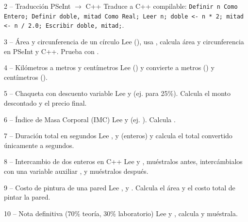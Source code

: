 \documentclass[11pt,letterpaper]{article}
\begin{document}
\begin{ejercicio}{2 -- Traducción PSeInt $\rightarrow$ C++}
Traduce a C++ compilable: \texttt{Definir n Como Entero; Definir doble, mitad Como Real; Leer n; doble <- n * 2; mitad <- n / 2.0; Escribir doble, mitad;}.
\end{ejercicio}

\begin{ejercicio}{3 -- Área y circunferencia de un círculo}
Lee  (), usa , calcula área y circunferencia en PSeInt y C++. Prueba con .
\end{ejercicio}

\begin{ejercicio}{4 -- Kilómetros a metros y centímetros}
Lee  () y convierte a metros () y centímetros ().
\end{ejercicio}

\begin{ejercicio}{5 -- Chaqueta con descuento variable}
Lee  y  (ej.  para 25\%). Calcula el monto descontado y el precio final.
\end{ejercicio}

\begin{ejercicio}{6 -- Índice de Masa Corporal (IMC)}
Lee  y  (ej. ). Calcula .
\end{ejercicio}

\begin{ejercicio}{7 -- Duración total en segundos}
Lee ,  y  (enteros) y calcula el total convertido únicamente a segundos.
\end{ejercicio}

\begin{ejercicio}{8 -- Intercambio de dos enteros en C++}
Lee  y , muéstralos antes, intercámbialos con una variable auxiliar , y muéstralos después.
\end{ejercicio}

\begin{ejercicio}{9 -- Costo de pintura de una pared}
Lee ,  y . Calcula el área y el costo total de pintar la pared.
\end{ejercicio}

\begin{ejercicio}{10 -- Nota definitiva (70\% teoría, 30\% laboratorio)}
Lee  y , calcula  y muéstrala.
\end{ejercicio}
\end{document}
